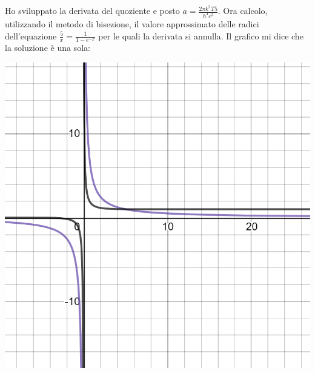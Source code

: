 \documentclass{article}
\theoremstyle{definition}
\begin{document}
\par Ho sviluppato la derivata del quoziente e posto \(a = \frac{2\pi k^{5}T5}{h^{4}c^{3}}\). Ora calcolo, utilizzando il metodo di bisezione, il valore approssimato delle radici dell'equazione \(\frac{5}{x}=\frac{1}{1-e^{-x}}\) per le quali la derivata si annulla. Il grafico mi dice che la soluzione è una sola:

\vspace{0.5cm}

\begin{minipage}{0.4\textwidth}
\includegraphics[width=\linewidth]{grafico2.png}
\end{minipage}
\hspace{0.5cm}
\end{document}
